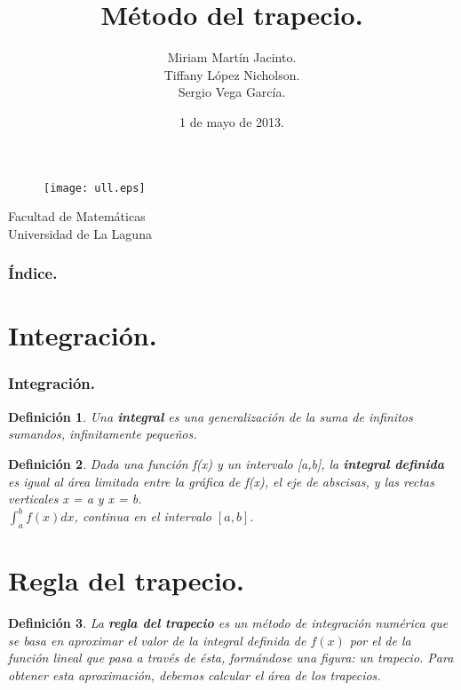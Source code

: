 \documentclass{beamer}
\title[Integración]{Método del trapecio.}
\author[Grupo-2D]{Miriam Martín Jacinto.\\Tiffany López Nicholson.\\Sergio Vega García.}
\date[01/05/2013]{1 de mayo de 2013.}
\newtheorem{definicion}{Definición}
\begin{document}
  \begin{frame}
	\begin{figure}[lt]
    	\texttt{[image: ull.eps]}
 	\end{figure}
    \titlepage
    \begin{scriptsize}
      \begin{center}
	Facultad de Matemáticas \\ Universidad de La Laguna
      \end{center}
    \end{scriptsize}
  \end{frame}

  \begin{frame}
    \frametitle{Índice.}
    \tableofcontents[pausesections]
  \end{frame}

  \section{Integración.}
  \begin{frame}
    \frametitle{Integración.}
      \begin{definicion}
	Una \textbf{integral} es una generalización de la suma de infinitos sumandos, infinitamente pequeños.
      \end{definicion}
	
      \begin{definicion}
	Dada una función f(x) y un intervalo [a,b], la \textbf{integral definida} es igual al área limitada entre la gráfica de f(x), el eje de abscisas, y las rectas verticales x = a y x = b.\\
	$\int_{a}^{b} f(x) dx$, continua en el intervalo $[a, b].$
      \end{definicion}


  \end{frame}
  \section{Regla del trapecio.}
  \begin{frame}
    \begin{definicion}
      La \textbf{regla del trapecio} es un método de integración numérica que se basa en aproximar el valor de la integral definida de $f(x)$ por el de la función lineal que pasa a través de ésta, formándose una figura: un trapecio. Para obtener esta aproximación, debemos calcular el área de los trapecios.
    \end{definicion}

  \end{frame}
\end{document}
